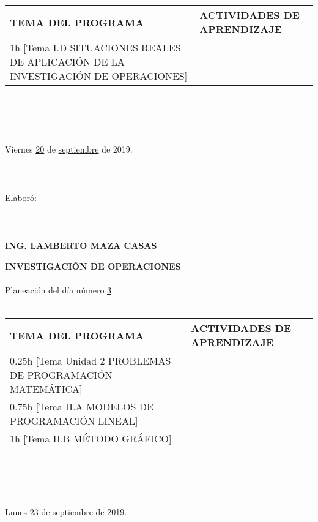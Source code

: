 \documentclass[landscape]{article}
\begin{document}
{\begin{center}
\begin{tabular}{|p{11cm}|p{8cm}|}
{\bf TEMA DEL PROGRAMA}&{\bf ACTIVIDADES DE APRENDIZAJE}\\\hline
	1h	[Tema I.D SITUACIONES REALES DE APLICACI\'ON DE LA INVESTIGACI\'ON DE OPERACIONES]
&\\
\hline
\end{tabular}
\ \\
\ \\
\ \\
\ \\
Viernes \underline{\hspace{0.5cm}20\hspace{0.5cm}} de  \underline{\hspace{0.5cm}septiembre\hspace{0.5cm}} de 2019.
\ \\
\ \\
\ \\
\ \\
Elabor\'o:
\ \\
\ \\
\ \\
\ \\
{\bf ING. LAMBERTO MAZA CASAS}
\end{center}
\eject
\begin{center}
{\bf 
INVESTIGACI\'ON DE OPERACIONES
}
\ \\
\ \\
Planeaci\'on del d\'ia n\'umero \underline{\hspace{0.5cm}3\hspace{0.5cm}}
\ \\
\ \\
\begin{tabular}{|p{11cm}|p{8cm}|}\hline
{\bf TEMA DEL PROGRAMA}&{\bf ACTIVIDADES DE APRENDIZAJE}\\\hline
	0.25h	[Tema Unidad 2 PROBLEMAS DE PROGRAMACI\'ON MATEM\'ATICA]
&\\
	0.75h	[Tema II.A MODELOS DE PROGRAMACI\'ON LI\-NEAL]
&\\
	1h	[Tema II.B M\'ETODO GR\'AFICO]
&\\
\hline
\end{tabular}
\ \\
\ \\
\ \\
\ \\
Lunes \underline{\hspace{0.5cm}23\hspace{0.5cm}} de  \underline{\hspace{0.5cm}septiembre\hspace{0.5cm}} de 2019.

\end{center}}
\end{document}
